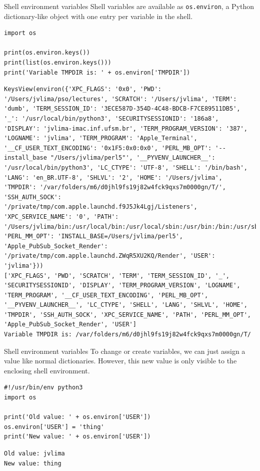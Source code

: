 \documentclass[xcolor=dvipsnames, 10pt, presentation,aspectratio=169]{beamer}
\begin{document}
\begin{frame}[label={sec:org21194fe},fragile]{Shell environment variables}
 Shell variables are available as \texttt{os.environ}, a Python dictionary-like
object with one entry per variable in the shell.
\lstset{language=Python,label= ,caption= ,captionpos=b,numbers=none}
\begin{lstlisting}
import os

print(os.environ.keys())
print(list(os.environ.keys()))
print('Variable TMPDIR is: ' + os.environ['TMPDIR'])
\end{lstlisting}

\begin{verbatim}
KeysView(environ({'XPC_FLAGS': '0x0', 'PWD': '/Users/jvlima/pso/lectures', 'SCRATCH': '/Users/jvlima', 'TERM': 'dumb', 'TERM_SESSION_ID': '3ECE587D-354D-4C48-BDCB-F7CE89511DB5', '_': '/usr/local/bin/python3', 'SECURITYSESSIONID': '186a8', 'DISPLAY': 'jvlima-imac.inf.ufsm.br', 'TERM_PROGRAM_VERSION': '387', 'LOGNAME': 'jvlima', 'TERM_PROGRAM': 'Apple_Terminal', '__CF_USER_TEXT_ENCODING': '0x1F5:0x0:0x0', 'PERL_MB_OPT': '--install_base "/Users/jvlima/perl5"', '__PYVENV_LAUNCHER__': '/usr/local/bin/python3', 'LC_CTYPE': 'UTF-8', 'SHELL': '/bin/bash', 'LANG': 'en_BR.UTF-8', 'SHLVL': '2', 'HOME': '/Users/jvlima', 'TMPDIR': '/var/folders/m6/d0jhl9fs19j82w4fck9qxs7m0000gn/T/', 'SSH_AUTH_SOCK': '/private/tmp/com.apple.launchd.f9J5Jk4Lgj/Listeners', 'XPC_SERVICE_NAME': '0', 'PATH': '/Users/jvlima/bin:/usr/local/bin:/usr/local/sbin:/usr/bin:/bin:/usr/sbin:/sbin:/usr/local/bin:/Library/TeX/texbin', 'PERL_MM_OPT': 'INSTALL_BASE=/Users/jvlima/perl5', 'Apple_PubSub_Socket_Render': '/private/tmp/com.apple.launchd.ZWqR5XU2KQ/Render', 'USER': 'jvlima'}))
['XPC_FLAGS', 'PWD', 'SCRATCH', 'TERM', 'TERM_SESSION_ID', '_', 'SECURITYSESSIONID', 'DISPLAY', 'TERM_PROGRAM_VERSION', 'LOGNAME', 'TERM_PROGRAM', '__CF_USER_TEXT_ENCODING', 'PERL_MB_OPT', '__PYVENV_LAUNCHER__', 'LC_CTYPE', 'SHELL', 'LANG', 'SHLVL', 'HOME', 'TMPDIR', 'SSH_AUTH_SOCK', 'XPC_SERVICE_NAME', 'PATH', 'PERL_MM_OPT', 'Apple_PubSub_Socket_Render', 'USER']
Variable TMPDIR is: /var/folders/m6/d0jhl9fs19j82w4fck9qxs7m0000gn/T/
\end{verbatim}
\end{frame}

\begin{frame}[label={sec:org32eac22},fragile]{Shell environment variables}
 To change or create variables, we can just assign a value like normal
dictionaries.
However, this new value is only visible to the enclosing shell
environment.
\lstset{language=Python,label= ,caption= ,captionpos=b,numbers=none}
\begin{lstlisting}
#!/usr/bin/env python3 
import os

print('Old value: ' + os.environ['USER'])
os.environ['USER'] = 'thing'
print('New value: ' + os.environ['USER'])
\end{lstlisting}

\begin{verbatim}
Old value: jvlima
New value: thing
\end{verbatim}
\end{frame}
\end{document}
